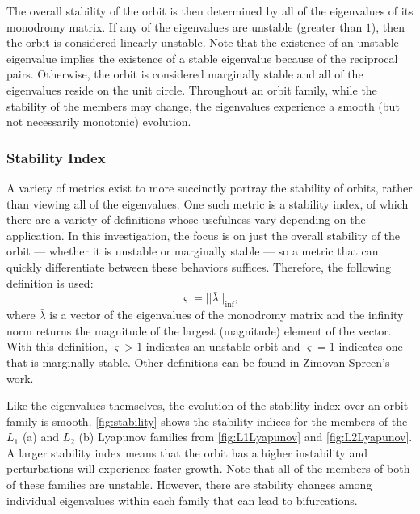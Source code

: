 The overall stability of the orbit is then determined by all of the eigenvalues of its monodromy
matrix. If any of the eigenvalues are unstable (greater than $1$), then the orbit is considered
linearly unstable. Note that the existence of an unstable eigenvalue implies the existence of a
stable eigenvalue because of the reciprocal pairs. Otherwise, the orbit is considered marginally
stable and all of the eigenvalues reside on the unit circle. Throughout an orbit family, while the
stability of the members may change, the eigenvalues experience a smooth (but not necessarily
monotonic) evolution.

\subsubsection{Stability Index}
A variety of metrics exist to more succinctly portray the stability of orbits, rather than viewing
all of the eigenvalues. One such metric is a stability index, of which there are a variety of
definitions whose usefulness vary depending on the application. In this investigation, the focus is
on just the overall stability of the orbit --- whether it is unstable or marginally stable --- so a
metric that can quickly differentiate between these behaviors suffices. Therefore, the following
definition is used\cite{Power:2019}:
\begin{equation}
    \varsigma=||\bar{\lambda}||_{\inf},
    \label{eq:stabilityindex}
\end{equation}
where $\bar{\lambda}$ is a vector of the eigenvalues of the monodromy matrix and the infinity norm
returns the magnitude of the largest (magnitude) element of the vector. With this definition,
$\varsigma>1$ indicates an unstable orbit and $\varsigma=1$ indicates one that is marginally
stable. Other definitions can be found in Zimovan Spreen's work\cite{ZimovanSpreen:2021}.

Like the eigenvalues themselves, the evolution of the stability index over an orbit family is
smooth. \cref{fig:stability} shows the stability indices for the members of the $L_{1}$ (a) and
$L_{2}$ (b) Lyapunov families from \cref{fig:L1Lyapunov} and \cref{fig:L2Lyapunov}. A larger
stability index means that the orbit has a higher instability and perturbations will experience
faster growth. Note that all of the members of both of these families are unstable. However, there
are stability changes among individual eigenvalues within each family that can lead to
bifurcations.

